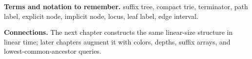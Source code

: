 \documentclass[11pt,letterpaper]{article}
\begin{document}
{\footnotesize
\textbf{Terms and notation to remember.} suffix tree, compact trie, terminator, path label, explicit node, implicit node, locus, leaf label, edge interval.

\textbf{Connections.} The next chapter constructs the same linear-size structure in linear time; later chapters augment it with colors, depths, suffix arrays, and lowest-common-ancestor queries.
}
\end{document}

